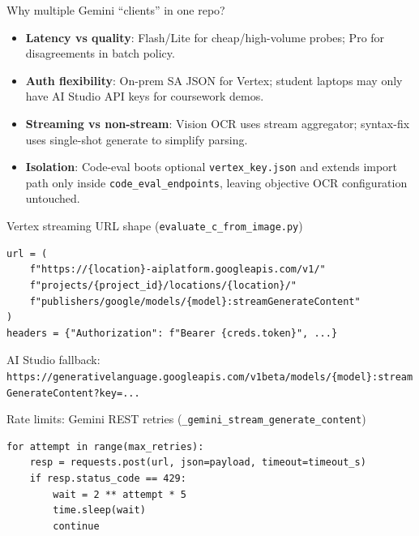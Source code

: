 \documentclass[aspectratio=169]{beamer}
\begin{document}
\begin{frame}{Why multiple Gemini ``clients'' in one repo?}
  \small
  \begin{itemize}
    \item \textbf{Latency vs quality}: Flash/Lite for cheap/high-volume probes; Pro for disagreements in batch policy.
    \item \textbf{Auth flexibility}: On-prem SA JSON for Vertex; student laptops may only have AI Studio API keys for coursework demos.
    \item \textbf{Streaming vs non-stream}: Vision OCR uses stream aggregator; syntax-fix uses single-shot generate to simplify parsing.
    \item \textbf{Isolation}: Code-eval boots optional \texttt{vertex\_key.json} and extends import path only inside \texttt{code\_eval\_endpoints}, leaving objective OCR configuration untouched.
  \end{itemize}
\end{frame}

\begin{frame}[fragile]{Vertex streaming URL shape (\texttt{evaluate\_c\_from\_image.py})}
\begin{lstlisting}[style=py]
url = (
    f"https://{location}-aiplatform.googleapis.com/v1/"
    f"projects/{project_id}/locations/{location}/"
    f"publishers/google/models/{model}:streamGenerateContent"
)
headers = {"Authorization": f"Bearer {creds.token}", ...}
\end{lstlisting}
\vfill
\tiny AI Studio fallback: \texttt{https://generativelanguage.googleapis.com/v1beta/models/\{model\}:streamGenerateContent?key=...}
\end{frame}

\begin{frame}[fragile]{Rate limits: Gemini REST retries (\texttt{\_gemini\_stream\_generate\_content})}
\begin{lstlisting}[style=py]
for attempt in range(max_retries):
    resp = requests.post(url, json=payload, timeout=timeout_s)
    if resp.status_code == 429:
        wait = 2 ** attempt * 5
        time.sleep(wait)
        continue
\end{lstlisting}
\end{frame}
\end{document}
